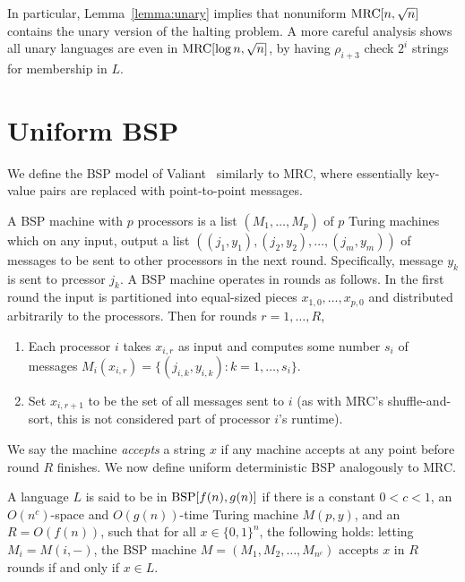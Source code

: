 In particular, Lemma~\ref{lemma:unary} implies that nonuniform $\textup{MRC}[n,
\sqrt{n}]$ contains the unary version of the halting problem. A more careful
analysis shows all unary languages are even in $\textup{MRC}[\log n, \sqrt{n}]$, by
having $\rho_{i+3}$ check $2^i$ strings for membership in $L$.

\section{Uniform BSP}
We define the BSP model of Valiant~\cite{Valiant90} similarly to MRC, where
essentially key-value pairs are replaced with point-to-point messages.

A BSP machine with $p$ processors is a list $(M_1, \dots, M_p)$ of $p$ Turing
machines which on any input, output a list $((j_1, y_1), (j_2, y_2), \dots,
(j_m, y_m))$ of messages to be sent to other processors in the next round.
Specifically, message $y_k$ is sent to prcessor $j_k$. A BSP machine operates
in rounds as follows. In the first round the input is partitioned into
equal-sized pieces $x_{1,0}, \dots, x_{p,0}$ and distributed arbitrarily to the
processors. Then for rounds $r=1, \dots, R$, 

\begin{enumerate}
   \item Each processor $i$ takes $x_{i,r}$ as input and computes some number
$s_i$ of messages $M_i(x_{i,r}) = \{(j_{i,k}, y_{i,k}) : k = 1, \dots, s_i\}$.
   \item Set $x_{i,r+1}$ to be the set of all messages sent to $i$ (as with
MRC's shuffle-and-sort, this is not considered part of processor $i$'s
runtime). 
\end{enumerate} 

We say the machine \emph{accepts} a string $x$ if any machine accepts at any
point before round $R$ finishes. We now define uniform deterministic BSP
analogously to MRC.

\begin{definition}

A language $L$ is said to be in $\textup{BSP}[f(n),g(n)]$ if there is a constant $0 < c
< 1$, an $O(n^c)$-space and $O(g(n))$-time Turing machine $M(p, y)$, and an $R
= O(f(n))$, such that for all $x \in \{ 0,1 \}^n$, the following holds: letting
$M_i = M(i, -)$, the BSP machine $M = (M_1, M_2, \dots, M_{n^c})$ accepts $x$
in $R$ rounds if and only if $x \in L$.

\end{definition}

